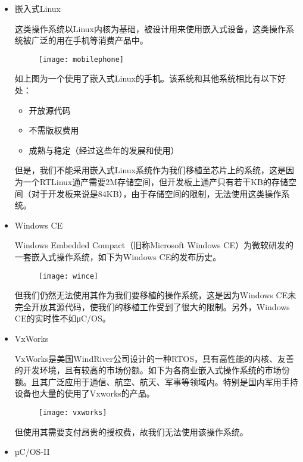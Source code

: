 \documentclass{ctexart}
\begin{document}
\begin{itemize}
  \item 嵌入式Linux\cite{wiki02}\par
    这类操作系统以Linux内核为基础，被设计用来使用嵌入式设备，这类操作系统被广泛的用在手机等消费产品中。\par
    \begin{figure}[h]
\centering
    \texttt{[image: mobilephone]}\par
    \end{figure}
    如上图为一个使用了嵌入式Linux的手机。该系统和其他系统相比有以下好处：
    \begin{itemize}
      \item 开放源代码
      \item 不需版权费用
      \item 成熟与稳定（经过这些年的发展和使用）
    \end{itemize}
    但是，我们不能采用嵌入式Linux系统作为我们移植至芯片上的系统，这是因为一个RTLinux通产需要2M存储空间，但开发板上通产只有若干KB的存储空间（对于开发板来说是84KB），由于存储空间的限制，无法使用这类操作系统。
  \item Windows CE\cite{wiki03}\par
    Windows Embedded Compact（旧称Microsoft Windows CE）为微软研发的一套嵌入式操作系统，如下为Windows CE的发布历史。\par
    \begin{figure}[h]
\centering
    \texttt{[image: wince]}\par
    \end{figure}
    但我们仍然无法使用其作为我们要移植的操作系统，这是因为Windows CE未完全开放其源代码，使我们的移植工作受到了很大的限制。另外，Windows CE的实时性不如μC/OS。
  \item VxWorks\cite{wiki04}\par
    VxWorks是美国WindRiver公司设计的一种RTOS，具有高性能的内核、友善的开发环境，且有较高的市场份额。\cite{Turley_undated-jf}如下为各商业嵌入式操作系统的市场份额。且其广泛应用于通信、航空、航天、军事等领域内。特别是国内军用手持设备也大量的使用了Vxworks的产品。\par
    \begin{figure}[h]
\centering
    \texttt{[image: vxworks]}\par
    \end{figure}
    但使用其需要支付昂贵的授权费，故我们无法使用该操作系统。
  \item µC/OS-II\cite{wiki05}\par

\end{itemize}
\end{document}

